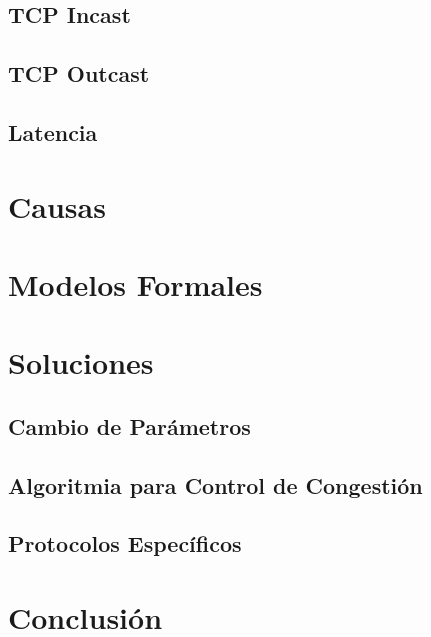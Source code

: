 \documentclass[runningheads,a4paper]{llncs}
\begin{document}
\subsection{TCP Incast}

\subsection{TCP Outcast}

\subsection{Latencia}

\section{Causas} \label{causes}

\section{Modelos Formales} \label{models}

\section{Soluciones} \label{solutions}

\subsection{Cambio de Parámetros}

\subsection{Algoritmia para Control de Congestión}

\subsection{Protocolos Específicos}

\section{Conclusión} \label{conclusion}


{}
\end{document}
